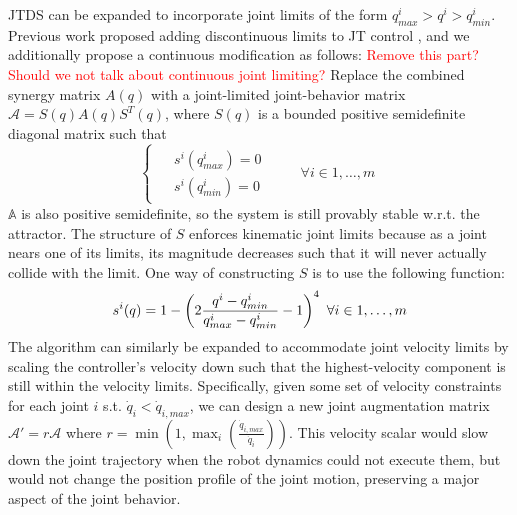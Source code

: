 \documentclass[letterpaper, 10 pt, conference,fleqn]{ieeeconf}
\begin{document}
JTDS can be expanded to incorporate joint limits of the form $q^i_{max} > q^i > q^i_{min}$. Previous work proposed adding discontinuous limits to JT control \cite{sciavicco1988solution}, and we additionally propose a continuous modification as follows: \textcolor{red}{Remove this part? Should we not talk about continuous joint limiting?} Replace the combined synergy matrix $A(q)$ with a joint-limited joint-behavior matrix $\mathcal{A} = S(q)A(q)S^T(q)$, where $S(q)$ is a bounded positive semidefinite diagonal matrix such that  
\begin{equation}
\label{eq:last_criteria}
\begin{cases}
\begin{split}
& s^{i}(q^i_{max}) = 0&&&\\
& s^{i}(q^i_{min})= 0&&&
\end{split}
\forall i\in 1,\dots,m
\end{cases}
\end{equation}
$\mathbb{A}$ is also positive semidefinite, so the system is still provably stable w.r.t. the attractor. The structure of $S$ enforces kinematic joint limits because as a joint nears one of its limits, its magnitude decreases such that it will never actually collide with the limit. One way of constructing $S$ is to use the following function:
\begin{equation}
s^{i}(q) =
1 - \left ( 2\frac{q^i - q^i_{min}}{q^i_{max} - q^i_{min}} - 1 \right ) ^{4}  ~\forall i\in 1,\dots,m\\
\end{equation}
The algorithm can similarly be expanded to accommodate joint velocity limits by scaling the controller's velocity down such that the highest-velocity component is still within the velocity limits. Specifically, given some set of velocity constraints for each joint $i$ s.t. $\dot{q}_i < \dot{q}_{i, max}$, we can design a new joint augmentation matrix $\mathcal{A}' = r \mathcal{A}$ where $r = \min \left ( 1, \max_i \left ( \frac{\dot{q}_{i, max}}{\dot{q}_i} \right ) \right )$. This velocity scalar would slow down the joint trajectory when the robot dynamics could not execute them, but would not change the position profile of the joint motion, preserving a major aspect of the joint behavior.
\end{document}
